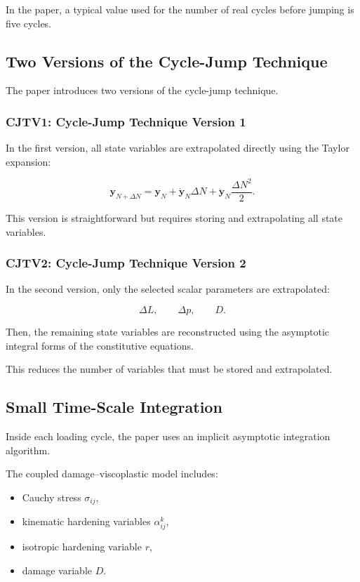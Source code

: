 ﻿\documentclass[11pt,a4paper]{article}
\begin{document}
In the paper, a typical value used for the number of real cycles before jumping is five cycles.

\subsection{Two Versions of the Cycle-Jump Technique}

The paper introduces two versions of the cycle-jump technique.

\subsubsection{CJTV1: Cycle-Jump Technique Version 1}

In the first version, all state variables are extrapolated directly using the Taylor expansion:

\[
\bm{y}_{N+\Delta N}
=
\bm{y}_{N}
+
\dot{\bm{y}}_{N}\Delta N
+
\ddot{\bm{y}}_{N}
\frac{\Delta N^2}{2}.
\]

This version is straightforward but requires storing and extrapolating all state variables.

\subsubsection{CJTV2: Cycle-Jump Technique Version 2}

In the second version, only the selected scalar parameters are extrapolated:

\[
\Delta L,
\qquad
\Delta p,
\qquad
D.
\]

Then, the remaining state variables are reconstructed using the asymptotic integral forms of the constitutive equations.

This reduces the number of variables that must be stored and extrapolated.

\subsection{Small Time-Scale Integration}

Inside each loading cycle, the paper uses an implicit asymptotic integration algorithm.

The coupled damage--viscoplastic model includes:

\begin{itemize}[leftmargin=*]
    \item Cauchy stress $\sigma_{ij}$,
    \item kinematic hardening variables $\alpha^k_{ij}$,
    \item isotropic hardening variable $r$,
    \item damage variable $D$.
\end{itemize}
\end{document}
